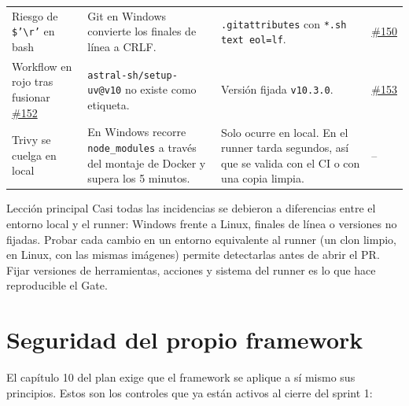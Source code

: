 \documentclass[11pt,a4paper]{report}
\newcommand{\pr}[1]{\href{https://github.com/PracticasESPE/Framework_Desarrollo_Seguro/pull/#1}{\##1}}
\begin{document}
{\begin{longtable}{@{}P{3.3cm}P{4.5cm}P{5.0cm}P{1.2cm}@{}}
Riesgo de \texttt{\$'\textbackslash r'} en bash & Git en Windows convierte los finales de línea a CRLF. & \texttt{.gitattributes} con \texttt{*.sh text eol=lf}. & \pr{150}\\
Workflow en rojo tras fusionar \pr{152} & \texttt{astral-sh/setup-uv@v10} no existe como etiqueta. & Versión fijada \texttt{v10.3.0}. & \pr{153}\\
Trivy se cuelga en local & En Windows recorre \texttt{node\_modules} a través del montaje de Docker y supera los 5 minutos. & Solo ocurre en local. En el runner tarda segundos, así que se valida con el CI o con una copia limpia. & --\\
\bottomrule
\end{longtable}}

\begin{cajaocre}{Lección principal}
Casi todas las incidencias se debieron a diferencias entre el entorno local y el runner: Windows
frente a Linux, finales de línea o versiones no fijadas. Probar cada cambio en un entorno
equivalente al runner (un clon limpio, en Linux, con las mismas imágenes) permite detectarlas
antes de abrir el PR. Fijar versiones de herramientas, acciones y sistema del runner es lo que
hace reproducible el Gate.
\end{cajaocre}

\chapter{Seguridad del propio framework}

El capítulo 10 del plan exige que el framework se aplique a sí mismo sus principios. Estos son
los controles que ya están activos al cierre del sprint 1:
\end{document}
